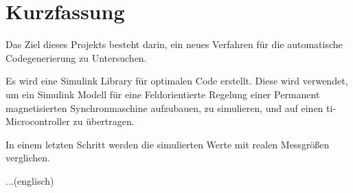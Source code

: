 \chapter*{Kurzfassung}
\begin{graubox}

Das Ziel dieses Projekts besteht darin, ein neues Verfahren für die automatische Codegenerierung zu Untersuchen.

Es wird eine Simulink Library für optimalen Code erstellt.
Diese wird verwendet, um ein Simulink Modell für eine Feldorientierte Regelung einer Permanent magnetisierten Synchronmaschine aufzubauen, zu simulieren, und auf einen ti-Microcontroller zu übertragen.

In einem letzten Schritt werden die simulierten Werte mit realen Messgrößen verglichen.

\end{graubox}

\begin{graubox}

...(englisch)
\end{graubox}